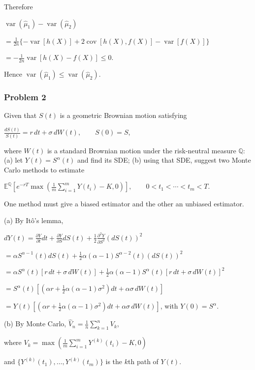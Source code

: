 Therefore

$\operatorname{var}(\widehat\mu_1)-\operatorname{var}(\widehat\mu_2)$

$=\frac1{2n}\{-\operatorname{var}[h(X)]+2\operatorname{cov}[h(X),f(X)]-\operatorname{var}[f(X)]\}$

$=-\frac1{2n}\operatorname{var}[h(X)-f(X)]\leq0$.

Hence $\operatorname{var}(\widehat\mu_1)\leq\operatorname{var}(\widehat\mu_2)$.

\subsubsection*{Problem 2}

 Given that $S(t)$ is a geometric Brownian motion satisfying

$\frac{dS(t)}{S(t)}=r\,dt+\sigma\,dW(t),\qquad S(0)=S$,

where $W(t)$ is a standard Brownian motion under the risk-neutral measure $\mathbb{Q}$: (a) let $Y(t)=S^\alpha(t)$ and find its SDE; (b) using that SDE, suggest two Monte Carlo methods to estimate

$\mathbb{E}^{\mathbb Q}\left[e^{-rT}\max\left(\frac1m\sum_{i=1}^mY(t_i)-K,0\right)\right],\qquad 0<t_1<\cdots<t_m<T$.

One method must give a biased estimator and the other an unbiased estimator.

 (a) By It\^o's lemma,

$dY(t)=\frac{\partial Y}{\partial t}dt+\frac{\partial Y}{\partial S}dS(t)+\frac12\frac{\partial^2Y}{\partial S^2}(dS(t))^2$

$=\alpha S^{\alpha-1}(t)dS(t)+\frac12\alpha(\alpha-1)S^{\alpha-2}(t)(dS(t))^2$

$=\alpha S^\alpha(t)[r\,dt+\sigma\,dW(t)]+\frac12\alpha(\alpha-1)S^\alpha(t)[r\,dt+\sigma\,dW(t)]^2$

$=S^\alpha(t)\left[\left(\alpha r+\frac12\alpha(\alpha-1)\sigma^2\right)dt+\alpha\sigma\,dW(t)\right]$

$=Y(t)\left[\left(\alpha r+\frac12\alpha(\alpha-1)\sigma^2\right)dt+\alpha\sigma\,dW(t)\right]$,
with $Y(0)=S^\alpha$.

(b) By Monte Carlo,
$\widehat V_n=\frac1n\sum_{k=1}^nV_k$,

where
$V_k=\max\left(\frac1m\sum_{i=1}^mY^{(k)}(t_i)-K,0\right)$

and $\{Y^{(k)}(t_1),\ldots,Y^{(k)}(t_m)\}$ is the $k$th path of $Y(t)$.


